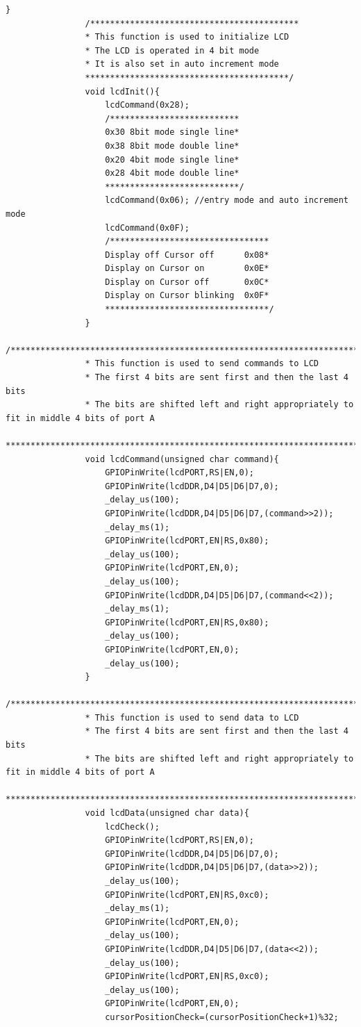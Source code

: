 \documentclass[a4paper,10pt,oneside]{article}
\begin{document}
\begin{lstlisting}[style=CStyle]
				}
				/******************************************
				* This function is used to initialize LCD
				* The LCD is operated in 4 bit mode
				* It is also set in auto increment mode
				*****************************************/
				void lcdInit(){
					lcdCommand(0x28);
					/**************************
					0x30 8bit mode single line*
					0x38 8bit mode double line*
					0x20 4bit mode single line*
					0x28 4bit mode double line*
					***************************/
					lcdCommand(0x06); //entry mode and auto increment mode
					lcdCommand(0x0F);
					/********************************
					Display off Cursor off      0x08*
					Display on Cursor on        0x0E*
					Display on Cursor off       0x0C*
					Display on Cursor blinking  0x0F*
					*********************************/
				}
				/***************************************************************************************
				* This function is used to send commands to LCD
				* The first 4 bits are sent first and then the last 4 bits
				* The bits are shifted left and right appropriately to fit in middle 4 bits of port A
				***************************************************************************************/
				void lcdCommand(unsigned char command){
					GPIOPinWrite(lcdPORT,RS|EN,0);
					GPIOPinWrite(lcdDDR,D4|D5|D6|D7,0);
					_delay_us(100);
					GPIOPinWrite(lcdDDR,D4|D5|D6|D7,(command>>2));
					_delay_ms(1);
					GPIOPinWrite(lcdPORT,EN|RS,0x80);
					_delay_us(100);
					GPIOPinWrite(lcdPORT,EN,0);
					_delay_us(100);
					GPIOPinWrite(lcdDDR,D4|D5|D6|D7,(command<<2));
					_delay_ms(1);
					GPIOPinWrite(lcdPORT,EN|RS,0x80);
					_delay_us(100);
					GPIOPinWrite(lcdPORT,EN,0);
					_delay_us(100);
				}
				/***************************************************************************************
				* This function is used to send data to LCD
				* The first 4 bits are sent first and then the last 4 bits
				* The bits are shifted left and right appropriately to fit in middle 4 bits of port A
				***************************************************************************************/
				void lcdData(unsigned char data){
					lcdCheck();
					GPIOPinWrite(lcdPORT,RS|EN,0);
					GPIOPinWrite(lcdDDR,D4|D5|D6|D7,0);
					GPIOPinWrite(lcdDDR,D4|D5|D6|D7,(data>>2));
					_delay_us(100);
					GPIOPinWrite(lcdPORT,EN|RS,0xc0);
					_delay_ms(1);
					GPIOPinWrite(lcdPORT,EN,0);
					_delay_us(100);
					GPIOPinWrite(lcdDDR,D4|D5|D6|D7,(data<<2));
					_delay_us(100);
					GPIOPinWrite(lcdPORT,EN|RS,0xc0);
					_delay_us(100);
					GPIOPinWrite(lcdPORT,EN,0);
					cursorPositionCheck=(cursorPositionCheck+1)%32;

\end{lstlisting}
\end{document}
